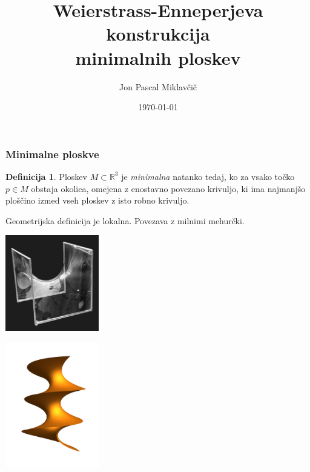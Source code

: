 \documentclass[10pt]{beamer}
\title[Weierstrass-Enneperjeva parametrizacija]{Weierstrass-Enneperjeva konstrukcija\\minimalnih ploskev}
\subtitle{}
\author[Jon Pascal Miklavčič]{Jon Pascal Miklavčič}
\institute[]{Mentor: doc.~dr.~Uroš Kuzman}
\date{\tiny \today}
\theoremstyle{definition}
\newtheorem{definicija}{Definicija}
\theoremstyle{remark}
\theoremstyle{plain}
\numberwithin{equation}{section}  %
\begin{document}
\frame{\titlepage}

\begin{frame}
    \frametitle{Minimalne ploskve}

    \begin{definicija}
        Ploskev $M \subset \mathbb{R}^3$ je \emph{minimalna} natanko tedaj, ko za vsako točko $p \in M$ obstaja okolica, omejena z enostavno povezano krivuljo, ki ima najmanjšo ploščino izmed vseh ploskev z isto robno krivuljo. 
    \end{definicija}

    Geometrijska definicija je lokalna. Povezava z milnimi mehurčki. 

    \begin{minipage}{0.45\linewidth}
        \centering
        \includegraphics[width=11em]{../Slike/Soap_Film.png}
    \end{minipage}
    \hfill 
    \begin{minipage}{0.45\linewidth}
        \centering
        \includegraphics[width=11em]{../Slike/Helically_Rotated_Catenary.jpg}
    \end{minipage}

\end{frame}
\end{document}
